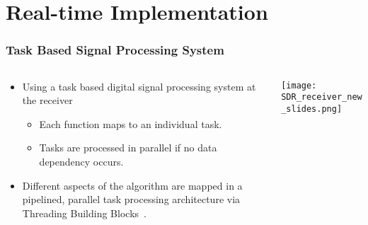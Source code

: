 \section{Real-time Implementation}



\begin{frame}
    \frametitle{Task Based Signal Processing System}

    \begin{columns}
      \begin{column}{0.515\textwidth}
        
        \begin{itemize}
          \item Using a task based digital signal processing system at the receiver 
          \begin{itemize}
              \item Each function maps to an individual task. 
              \item Tasks are processed in parallel if no data dependency occurs.             
             
          \end{itemize} 
          \item Different aspects of the algorithm are mapped in 
          a pipelined, parallel task processing architecture via Threading Building Blocks~\cite{Michael_19}. 


        \end{itemize}

      \end{column} 

    \begin{column}{0.46\textwidth} 

        \begin{center}
          \texttt{[image: SDR\_receiver\_new\_slides.png]}
        \end{center}
      
      \end{column}
    \end{columns}



\end{frame}
